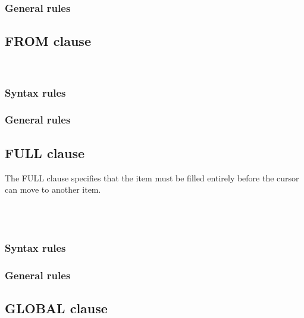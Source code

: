 \subsubsection{General rules}

\subsection{FROM clause}

\begin{syntax}
  \begin{1=}
    \identifier \\
    \literal
  \end{1=}
\end{syntax}

\subsubsection{Syntax rules}

\subsubsection{General rules}

\subsection{FULL clause}

The FULL clause specifies that the item must be filled entirely before the cursor can move to another item.

\begin{syntax}
  \begin{1=}
     \\
     \\
  \end{1=}
\end{syntax}

\subsubsection{Syntax rules}

\subsubsection{General rules}

\subsection{GLOBAL clause}

